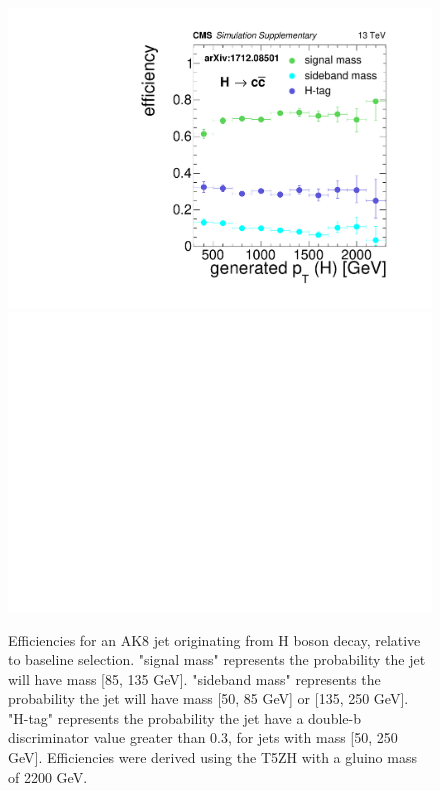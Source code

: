 \begin{figure}[hbp!]
\includegraphics[width=0.425\linewidth]{figs/CMS-SUS-17-006_Figure-aux_010.pdf}
\includegraphics[width=0.425\linewidth]{figs/blankcanvas.pdf}
\caption[Efficiencies for an AK8 jet originating from H boson decay, relative to baseline selection.]{
Efficiencies for an AK8 jet originating from H boson decay, relative to baseline selection.
"signal mass" represents the probability the jet will have mass [85, 135 GeV].
"sideband mass" represents the probability the jet will have mass [50, 85 GeV] or [135, 250 GeV].
"H-tag" represents the probability the jet have a double-b discriminator value greater than 0.3, for jets with mass [50, 250 GeV].
Efficiencies were derived using the T5ZH  with a gluino mass of 2200 GeV.
}
\label{fig:effH}
\end{figure}

